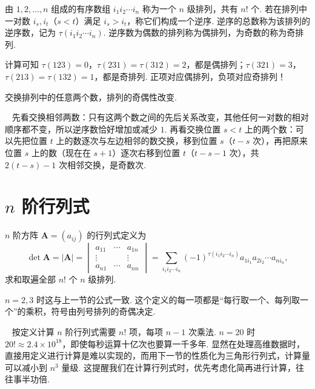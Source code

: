 \documentclass[lang=cn,10.5pt,scheme=chinese,toc=twocol,section,chinesefont=nofont,
twoside,citestyle=gb7714-2015,bibstyle=gb7714-2015]{elegantbook}
\DeclareRobustCommand{\textbf}[1]{{\lnsemiboldlatin\lnsemiboldcjk #1}}
\newcommand{\vv}[1]{\boldsymbol{#1}}
\numberwithin{equation}{section}   %
\newcommand*{\lnlabel}[1]{{\sffamily\bfseries\color{black}#1}}
\renewenvironment{proof}{%
	\par\noindent\lnlabel{\proofname}\;\ \color{black!90}\cfs}{\par}
\renewenvironment{remark}{\noindent\lnlabel{\remarkname}\ }{\par}
\begin{document}
\begin{definition}
  由 $1,2,\ldots,n$ 组成的有序数组 $i_1i_2\cdots i_n$ 称为一个 $n$ 级\textbf{排列}，共有 $n!$ 个. 若在排列中一对数 $i_s,i_t$（$s<t$）满足 $i_s>i_t$，称它们构成一个\textbf{逆序}. 逆序的总数称为该排列的\textbf{逆序数}，记为 $\tau(i_1i_2\cdots i_n)$. 逆序数为偶数的排列称为\textbf{偶排列}，为奇数的称为\textbf{奇排列}.
\end{definition}

计算可知 $\tau(123)=0$，$\tau(231)=\tau(312)=2$，都是偶排列；$\tau(321)=3$，$\tau(213)=\tau(132)=1$，都是奇排列. 正项对应偶排列，负项对应奇排列！

\begin{lemma}
  \label{lem:transposition}
  交换排列中的任意两个数，排列的奇偶性改变.
\end{lemma}
\begin{proof}
  先看交换相邻两数：只有这两个数之间的先后关系改变，其他任何一对数的相对顺序都不变，所以逆序数恰好增加或减少 $1$. 再看交换位置 $s<t$ 上的两个数：可以先把位置 $t$ 上的数逐次与左边相邻的数交换，移到位置 $s$（$t-s$ 次），再把原来位置 $s$ 上的数（现在在 $s+1$）逐次右移到位置 $t$（$t-s-1$ 次），共 $2(t-s)-1$ 次相邻交换，是奇数次.
\end{proof}

\section{\texorpdfstring{$n$}{n} 阶行列式}

\begin{definition}
  $n$ 阶方阵 $\vv A=(a_{ij})$ 的\textbf{行列式}定义为
  \[
    \det\vv A=|\vv A|=
    \begin{vmatrix}
      a_{11} & \cdots & a_{1n} \\ \vdots&&\vdots\\ a_{n1}&\cdots&a_{nn}
    \end{vmatrix}
    =\sum_{i_1i_2\cdots i_n}(-1)^{\tau(i_1i_2\cdots i_n)}a_{1i_1}a_{2i_2}\cdots a_{ni_n},
  \]
  求和取遍全部 $n!$ 个 $n$ 级排列.
\end{definition}

$n=2,3$ 时这与上一节的公式一致. 这个定义的每一项都是“每行取一个、每列取一个”的乘积，符号由列号排列的奇偶决定.

\begin{remark}
  按定义计算 $n$ 阶行列式需要 $n!$ 项，每项 $n-1$ 次乘法. $n=20$ 时 $20!\approx2.4\times10^{18}$，即使每秒运算十亿次也要算一千多年. 显然在处理高维数据时，直接用定义进行计算是难以实现的，而用下一节的性质化为三角形行列式，计算量可以减小到 $n^3$ 量级. 这提醒我们在计算行列式时，优先考虑化简再进行计算，往往事半功倍.
\end{remark}
\end{document}
